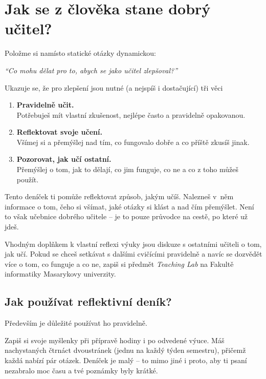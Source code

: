 
\chapter*{Jak se z člověka stane dobrý učitel?}

\vspace*{1em}
Položme si namísto statické otázky dynamickou:

\vspace*{1em}
\textit{\large \enquote{Co mohu dělat pro to, abych se jako učitel zlepšoval?}}

\vspace*{1em}
Ukazuje se, že pro zlepšení jsou nutné (a nejspíš i dostačující) tři věci\footnotemark
{}
\begin{enumerate}
\item \textbf{Pravidelně učit.}\\Potřebuješ mít vlastní zkušenost, nejlépe často a pravidelně opakovanou.
\item \textbf{Reflektovat svoje učení.}\\Všímej si a přemýšlej nad tím, co fungovalo dobře a co příště zkusíš jinak.
\item \textbf{Pozorovat, jak učí ostatní.}\\Přemýšlej o tom, jak to dělají, co jim funguje, co ne a co z toho můžeš použít.
\end{enumerate}

Tento deníček ti pomůže reflektovat způsob, jakým učíš. Nalezneš v~něm informace o tom, čeho si všímat, jaké otázky si klást a nad čím přemýšlet. Není to však učebnice dobrého učitele -- je to pouze průvodce na cestě, po které už jdeš.

Vhodným doplňkem k vlastní reflexi výuky jsou diskuze s ostatními učiteli o tom, jak učí. Pokud se chceš setkávat s dalšími cvičícími pravidelně a navíc se dozvědět více o tom, co funguje a co ne, zapiš si předmět \textit{Teaching Lab} na Fakultě informatiky Masarykovy univerzity.

\newpage
\section*{Jak používat reflektivní deník?}

Především je důležité používat ho pravidelně.

Zapiš si svoje myšlenky při přípravě hodiny i po odvedené výuce. Máš nachystaných čtrnáct dvoustránek (jednu na každý týden semestru), přičemž každá nabízí pár otázek. Deníček je malý -- to mimo jiné i proto, aby ti psaní nezabralo moc času a tvé poznámky byly krátké.

